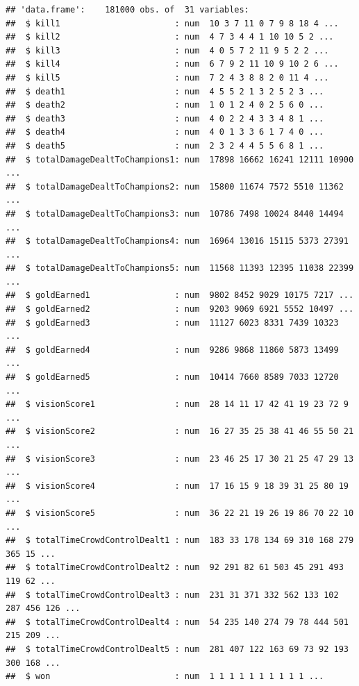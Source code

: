 \documentclass[
]{article}
\begin{document}
\begin{verbatim}
## 'data.frame':    181000 obs. of  31 variables:
##  $ kill1                       : num  10 3 7 11 0 7 9 8 18 4 ...
##  $ kill2                       : num  4 7 3 4 4 1 10 10 5 2 ...
##  $ kill3                       : num  4 0 5 7 2 11 9 5 2 2 ...
##  $ kill4                       : num  6 7 9 2 11 10 9 10 2 6 ...
##  $ kill5                       : num  7 2 4 3 8 8 2 0 11 4 ...
##  $ death1                      : num  4 5 5 2 1 3 2 5 2 3 ...
##  $ death2                      : num  1 0 1 2 4 0 2 5 6 0 ...
##  $ death3                      : num  4 0 2 2 4 3 3 4 8 1 ...
##  $ death4                      : num  4 0 1 3 3 6 1 7 4 0 ...
##  $ death5                      : num  2 3 2 4 4 5 5 6 8 1 ...
##  $ totalDamageDealtToChampions1: num  17898 16662 16241 12111 10900 ...
##  $ totalDamageDealtToChampions2: num  15800 11674 7572 5510 11362 ...
##  $ totalDamageDealtToChampions3: num  10786 7498 10024 8440 14494 ...
##  $ totalDamageDealtToChampions4: num  16964 13016 15115 5373 27391 ...
##  $ totalDamageDealtToChampions5: num  11568 11393 12395 11038 22399 ...
##  $ goldEarned1                 : num  9802 8452 9029 10175 7217 ...
##  $ goldEarned2                 : num  9203 9069 6921 5552 10497 ...
##  $ goldEarned3                 : num  11127 6023 8331 7439 10323 ...
##  $ goldEarned4                 : num  9286 9868 11860 5873 13499 ...
##  $ goldEarned5                 : num  10414 7660 8589 7033 12720 ...
##  $ visionScore1                : num  28 14 11 17 42 41 19 23 72 9 ...
##  $ visionScore2                : num  16 27 35 25 38 41 46 55 50 21 ...
##  $ visionScore3                : num  23 46 25 17 30 21 25 47 29 13 ...
##  $ visionScore4                : num  17 16 15 9 18 39 31 25 80 19 ...
##  $ visionScore5                : num  36 22 21 19 26 19 86 70 22 10 ...
##  $ totalTimeCrowdControlDealt1 : num  183 33 178 134 69 310 168 279 365 15 ...
##  $ totalTimeCrowdControlDealt2 : num  92 291 82 61 503 45 291 493 119 62 ...
##  $ totalTimeCrowdControlDealt3 : num  231 31 371 332 562 133 102 287 456 126 ...
##  $ totalTimeCrowdControlDealt4 : num  54 235 140 274 79 78 444 501 215 209 ...
##  $ totalTimeCrowdControlDealt5 : num  281 407 122 163 69 73 92 193 300 168 ...
##  $ won                         : num  1 1 1 1 1 1 1 1 1 1 ...
\end{verbatim}
\end{document}
